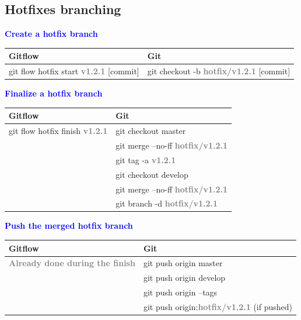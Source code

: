 \documentclass{tufte-handout}
\begin{document}
		\clearpage
		

		\subsection{Hotfixes branching}
		
		\hspace{1em}\textbf{\textcolor{blue}{Create a hotfix branch}}
		
		\begin{table}[ht]
			\centering
			\selectfont
			\begin{tabular}{ll}
				Gitflow & Git \\
				\midrule
				git flow hotfix start \textbf{\textcolor{gray}{v1.2.1}} {[}commit{]} & git checkout -b \textbf{\textcolor{gray}{hotfix/v1.2.1}} {[}commit{]} \\
			\end{tabular}
			\label{tab:normaltab}
		\end{table}
		\medskip %
		
		
		\textbf{\textcolor{blue}{Finalize a hotfix branch}}
	
		
		\begin{table}[ht]
			\centering
			\selectfont
			\begin{tabular}{ll}
				Gitflow & Git \\
				\midrule
				git flow hotfix finish \textbf{\textcolor{gray}{v1.2.1}} & git checkout master \\
				& git merge --no-ff \textbf{\textcolor{gray}{hotfix/v1.2.1}} \\
				& git tag -a \textbf{\textcolor{gray}{v1.2.1}} \\
				& git checkout develop \\
				& git merge --no-ff \textbf{\textcolor{gray}{hotfix/v1.2.1}} \\
				& git branch -d \textbf{\textcolor{gray}{hotfix/v1.2.1}} \\
			\end{tabular}
			\label{tab:normaltab}
		\end{table}
		\medskip %
		
		\textbf{\textcolor{blue}{Push the merged hotfix branch}}
		
		\begin{table}[ht]
			\centering
			\selectfont
			\begin{tabular}{ll}
				Gitflow & Git \\
				\midrule
				\textbf{\textcolor{gray}{Already done during the finish}} & git push origin master \\
				& git push origin develop \\
				& git push origin --tags \\
				& git push origin:\textbf{\textcolor{gray}{hotfix/v1.2.1}} (if pushed) \\
			\end{tabular}
			\label{tab:normaltab}
		\end{table}
		\medskip %
		
\end{document}
